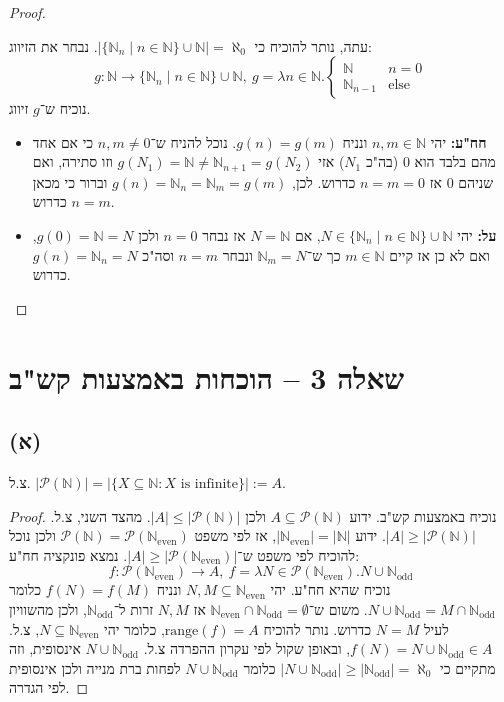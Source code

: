 \documentclass[]{article}
\newcommand\N     {\mathbb{N}}
\newcommand\ps    {\mathcal{P}}
\newcommand\Neven {\N_{\mathrm{even}}}
\newcommand\Nodd  {\N_{\mathrm{odd }}}
\newcommand\other {\text{else}}
\newcommand\range {\text{range}}
\newcommand\az    {\aleph_0}
\begin{document}
\begin{proof}
\begin{itemize}
	\end{itemize}
	עתה, נותר להוכיח כי $|\{\N_n \mid n\in \N\} \cup \N| = \az$. נבחר את הזיווג: 
	$$ g \colon \N \to \{\N_n \mid n \in \N\} \cup \N,\ g = \lambda n \in \N. \begin{cases}
		\N &n = 0 \\
		\N_{n - 1} &\other
	\end{cases}$$
נוכיח ש־$g$ זיווג. 
	\begin{itemize}
		\item \textbf{חח"ע: }יהי $n, m \in \N$ ונניח $g(n) = g(m)$. נוכל להניח ש־$n, m \neq 0$ כי אם אחד מהם בלבד הוא $0$ (בה"כ $N_1$) אזי $g(N_1) = \N \neq \N_{n + 1} = g(N_2)$ וזו סתירה, ואם שניהם 0 אז $n = m = 0$ כדרוש. לכן, $g(n) = \N_n = \N_m = g(m)$ וברור כי מכאן $n = m$ כדרוש. 
		\item \textbf{על: }יהי $N \in \{\N_n \mid n \in \N\} \cup \N$, אם $N = \N$ אז נבחר $n = 0$ ולכן $g(0) = \N = N$, ואם לא כן אז קיים $m \in \N$ כך ש־$\N_m = N$ ונבחר $n = m$ וסה"כ $g(n) = \N_n = N$ כדרוש. 
	\end{itemize}
	\end{proof}
	
	\section*{שאלה 3 – הוכחות באמצעות קש"ב}
	\subsection*{(א)}
	צ.ל.  $|\ps(\N)| = |\{X \subseteq \N \colon X \text{ is infinite}\}| := A$. 
	\begin{proof}
		נוכיח באמצעות קש"ב. ידוע $ A \subseteq \ps(\N) $ ולכן $ |A| \le |\ps(\N)| $. מהצד השני, צ.ל. $ |A| \ge |\ps(\N)| $. ידוע $ |\Neven|= |\N| $, אז לפי משפט $ \ps(\N) = \ps(\Neven) $ ולכן נוכל להוכיח לפי משפט ש־$ |A| \ge |\ps(\Neven)| $. נמצא פונקציה חח"ע: 
		\[ f \colon \ps(\Neven) \to A, \ f = \lambda N \in \ps(\Neven). N \cup \Nodd \]
		נוכיח שהיא חח"ע. יהי $ N, M \subseteq \Neven $ ונניח $ f(N) = f(M) $ כלומר $ N \cup \Nodd = M \cap \Nodd $. משום ש־$ \Neven \cap \Nodd = \emptyset $ אז $ N, M $ זרות ל־$ \Nodd $, ולכן מהשוויון לעיל $ N = M $ כדרוש. נותר להוכיח $ \range(f) = A $, כלומר יהי $ N \subseteq \Neven $, צ.ל. $ f(N) = N \cup \Nodd \in A $, ובאופן שקול לפי עקרון ההפרדה צ.ל. $ N \cup \Nodd $ אינסופית, וזה מתקיים כי $ |N \cup \Nodd| \ge |\Nodd| =\az $ כלומר $ N \cup \Nodd $ לפחות ברת מנייה ולכן אינסופית לפי הגדרה. 
	\end{proof}
	
\end{document}
